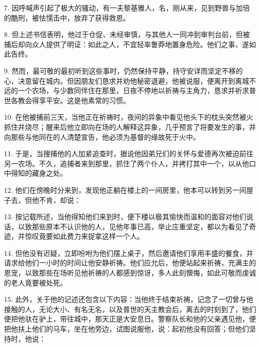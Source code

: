 7. 因呼喊声引起了极大的骚动，有一夫黎基雅人，名，刚从来，见到野兽与加倍的酷刑，被怯懦击中，放弃了获得救恩。\par

8. 但上述书信表明，他过于仓促、未经审慎，与其他人一同冲到审判台前，但被捕后却向众人提供了明证：如此之人，不宜轻率鲁莽地置身危险。他们之事，遂如此告终。\par

9. 然而，最可敬的最初听到这些事时，仍然保持平静，持守安详而坚定不移的心，决意留在城内。但因朋友们恳求并劝他秘密退避，他被说服，便离开到离城不远的一个农场，与少数同伴住在那里，日夜不停地以祈祷与主角力，恳求并祈求普世各教会得享平安。这是他素常的习惯。\par

10. 在他被捕前三天，当他正在祈祷时，夜间的异象中看见他头下的枕头突然被火抓住并烧尽；醒来后他立即向在场的人解释这异象，几乎预言了将要发生的事，并向那些与他同在的人清楚宣告，他必须为基督的缘故死于火中。\par

11. 于是，当搜捕他的人加紧追查时，据说他因弟兄们的关怀与爱德再次被迫前往另一农场。不久，追捕者来到那里，抓住了两个仆人，并拷打其中一个，以从他口中得知的藏身之处。\par

12. 他们在傍晚时分来到，发现他正躺在楼上的一间房里，他本可以转到另一间屋子去，但他不肯，却说：\par

13. 按记载所述，当他得知他们来到时，便下楼以极其愉快而温和的面容对他们说话，以致那些原本不认识他的人，见他年事已高，举止庄重坚定，都以为看见了奇迹，并惊叹竟要如此费力来捉拿这样一个人。\par

14. 但他没有迟疑，立即吩咐为他们摆上桌子，然后邀请他们享用丰盛的餐食，并请求给他们一小时的时间让他安静祈祷。他们应允后，他便站起来祈祷，充满主的恩宠，以致那些在场听见他祈祷的人都感到惊讶，多人此刻懊悔，如此可敬而虔诚的老人竟要被处死。\par

15. 此外，关于他的记述还包含以下内容：当他终于结束祈祷，记念了一切曾与他接触的人，无论大小、有名无名，以及普世的天主教会后，离去的时刻到了，他们便把他驮在驴上，带往城中，那天正是大安息日。警察队长和他的父亲遇见他，便把他扶上他们的马车，坐在他旁边，试图说服他，说：起初他没有回答；但他们坚持时，他说：\par

